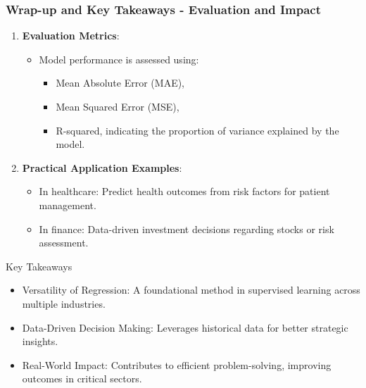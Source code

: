 \documentclass[aspectratio=169]{beamer}
\begin{document}
\begin{frame}[fragile]
  \frametitle{Wrap-up and Key Takeaways - Evaluation and Impact}
  \begin{enumerate}[resume]
    \item \textbf{Evaluation Metrics}:
      \begin{itemize}
        \item Model performance is assessed using:
          \begin{itemize}
            \item Mean Absolute Error (MAE),
            \item Mean Squared Error (MSE),
            \item R-squared, indicating the proportion of variance explained by the model.
          \end{itemize}
      \end{itemize}
  
    \item \textbf{Practical Application Examples}:
      \begin{itemize}
        \item In healthcare: Predict health outcomes from risk factors for patient management.
        \item In finance: Data-driven investment decisions regarding stocks or risk assessment.
      \end{itemize}
  \end{enumerate}

  \begin{block}{Key Takeaways}
    \begin{itemize}
      \item Versatility of Regression: A foundational method in supervised learning across multiple industries.
      \item Data-Driven Decision Making: Leverages historical data for better strategic insights.
      \item Real-World Impact: Contributes to efficient problem-solving, improving outcomes in critical sectors.
    \end{itemize}
  \end{block}
\end{frame}
\end{document}

